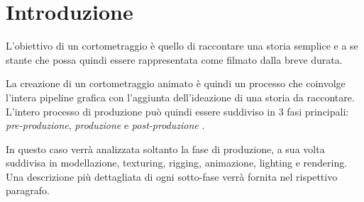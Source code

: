 
\chapter{Introduzione} %

\label{Chapter1} %

L'obiettivo di un cortometraggio è quello di raccontare una storia semplice e a se stante che possa quindi essere rappresentata come filmato dalla breve durata.

La creazione di un cortometraggio animato è quindi un processo che coinvolge l'intera pipeline grafica con l'aggiunta dell'ideazione di una storia da raccontare. L'intero processo di produzione può quindi essere suddiviso in 3 fasi principali: \emph{pre-produzione}, \emph{produzione} e \emph{post-produzione} \parencite{roy2014finish}.

In questo caso verrà analizzata soltanto la fase di produzione, a sua volta suddivisa in modellazione, texturing, rigging, animazione, lighting e rendering. Una descrizione più dettagliata di ogni sotto-fase verrà fornita nel rispettivo paragrafo. 
